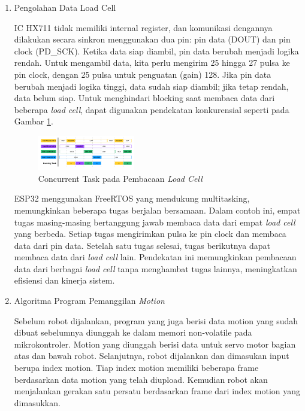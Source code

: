 \begin{enumerate}[label=\Alph*.]
    \item Pengolahan Data Load Cell
    \label{subsec:firmwaremikrokontroler}

    \hspace*{1em} IC HX711 tidak memiliki internal register, dan komunikasi dengannya dilakukan secara sinkron menggunakan dua pin: pin data (DOUT) dan pin clock (PD\_SCK). Ketika data siap diambil, pin data berubah menjadi logika rendah. Untuk mengambil data, kita perlu mengirim 25 hingga 27 pulsa ke pin clock, dengan 25 pulsa untuk penguatan (gain) 128. Jika pin data berubah menjadi logika tinggi, data sudah siap diambil; jika tetap rendah, data belum siap. Untuk menghindari blocking saat membaca data dari beberapa \emph{load cell}, dapat digunakan pendekatan konkurensial seperti pada Gambar \ref{fig:Task_LoadCell}.

    \begin{figure} [h] \centering
      \includegraphics[width=0.4\textwidth]{gambar/Task_LoadCell.png}
      \caption{Concurrent Task pada Pembacaan \emph{Load Cell}}
      \label{fig:Task_LoadCell}
    \end{figure}

    \hspace*{1em} ESP32 menggunakan FreeRTOS yang mendukung multitasking, memungkinkan beberapa tugas berjalan bersamaan. Dalam contoh ini, empat tugas masing-masing bertanggung jawab membaca data dari empat \emph{load cell} yang berbeda. Setiap tugas mengirimkan pulsa ke pin clock dan membaca data dari pin data. Setelah satu tugas selesai, tugas berikutnya dapat membaca data dari \emph{load cell} lain. Pendekatan ini memungkinkan pembacaan data dari berbagai \emph{load cell} tanpa menghambat tugas lainnya, meningkatkan efisiensi dan kinerja sistem.


    \item Algoritma Program Pemanggilan \textit{Motion}
    \label{subsec:algoritmamotion}

    \hspace*{1em} Sebelum robot dijalankan, program yang juga berisi data motion yang sudah dibuat sebelumnya diunggah ke dalam memori non-volatile pada  mikrokontroler. Motion yang diunggah berisi data untuk servo motor bagian atas dan bawah robot. Selanjutnya, robot dijalankan dan dimasukan input berupa index motion. Tiap index motion memiliki beberapa frame berdasarkan data motion yang telah diupload. Kemudian robot akan menjalankan gerakan satu persatu berdasarkan frame dari index motion yang dimasukkan.


\end{enumerate}
